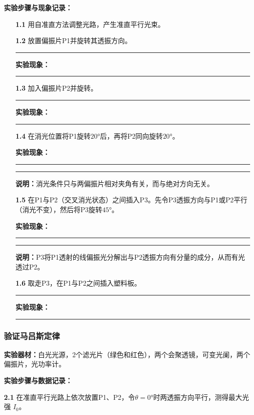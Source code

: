 \documentclass[dvipsnames, svgnames,a4paper,11pt]{article}
\newcommand{\recordblank}[1]{%
  \par\noindent\rule{0.95\linewidth}{0pt}\rule{0pt}{#1}\par}
\begin{document}
\textbf{实验步骤与现象记录：}
\begin{enumerate}
    \item[\textbf{1.1}] 用自准直方法调整光路，产生准直平行光束。
    \item[\textbf{1.2}] 放置偏振片P1并旋转其透振方向。
    \recordblank{5cm}
    \par\noindent\textbf{实验现象：}\par
\recordblank{4cm}
    \item[\textbf{1.3}] 加入偏振片P2并旋转。

    \recordblank{6cm}

    \par\noindent\textbf{实验现象：}\par
\recordblank{4cm}
    
    \item[\textbf{1.4}] 在消光位置将P1旋转$20°$后，再将P2同向旋转$20°$。
    \par\noindent\textbf{实验现象：}\par
    \recordblank{4cm}
    
    \recordblank{6cm}
    \textbf{说明：}消光条件只与两偏振片相对夹角有关，而与绝对方向无关。

    \item[\textbf{1.5}] 在P1与P2（交叉消光状态）之间插入P3。先令P3透振方向与P1或P2平行（消光不变），然后将P3旋转$45°$。\par\noindent\textbf{实验现象：}\par
\recordblank{4cm}
    \recordblank{5cm}
    \textbf{说明：}P3将P1透射的线偏振光分解出与P2透振方向有分量的成分，从而有光透过P2。
    \item[\textbf{1.6}] 取走P3，在P1与P2之间插入塑料板。
    \recordblank{6cm}
    \par\noindent\textbf{实验现象：}\par
\recordblank{4cm}
\end{enumerate}

\clearpage

\subsubsection{验证马吕斯定律}
\textbf{实验器材：}白光光源，2个滤光片（绿色和红色），两个会聚透镜，可变光阑，两个偏振片，光功率计。

\textbf{实验步骤与数据记录：}

\textbf{2.1} 在准直平行光路上依次放置P1、P2，令$\theta = 0°$时两透振方向平行，测得最大光强 $I_0$。
\end{document}
